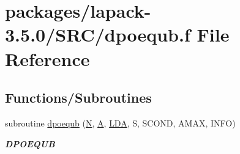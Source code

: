\hypertarget{dpoequb_8f}{}\section{packages/lapack-\/3.5.0/\+S\+R\+C/dpoequb.f File Reference}
\label{dpoequb_8f}
\subsection*{Functions/\+Subroutines}
\begin{DoxyCompactItemize}
\item 
subroutine \hyperlink{group__doublePOcomputational_ga771aa24ef6fe09d905031c56adf64a62}{dpoequb} (\hyperlink{polmisc_8c_a0240ac851181b84ac374872dc5434ee4}{N}, \hyperlink{classA}{A}, \hyperlink{example__user_8c_ae946da542ce0db94dced19b2ecefd1aa}{L\+D\+A}, S, S\+C\+O\+N\+D, A\+M\+A\+X, I\+N\+F\+O)
\begin{DoxyCompactList}\small\item\em {\bfseries D\+P\+O\+E\+Q\+U\+B} \end{DoxyCompactList}\end{DoxyCompactItemize}

